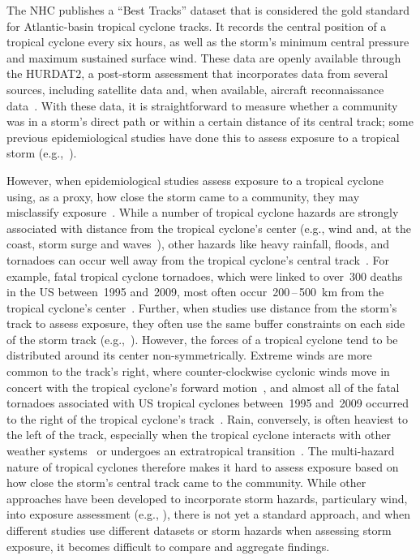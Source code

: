 The \ac{NHC} publishes a ``Best Tracks'' dataset that is considered the gold
standard for Atlantic-basin tropical cyclone tracks.  It records the central
position of a tropical cyclone every six hours, as well as the storm's minimum
central pressure and maximum sustained surface wind.  These data are openly
available through the \ac{HURDAT2}, a post-storm assessment that incorporates
data from several sources, including satellite data and, when available,
aircraft reconnaissance data~\parencite{landsea2013, jarvinen1988}.  With these
data, it is straightforward to measure whether a community was in a storm's
direct path or within a certain distance of its central track; some previous
epidemiological studies have done this to assess exposure to a tropical storm
(e.g.,~\cite{currie2013, kinney2008, caillouet2008increase}).

However, when epidemiological studies assess exposure to a tropical cyclone
using, as a proxy, how close the storm came to a community, they
may misclassify exposure~\parencite{grabich2015measuring}. While a number of
tropical cyclone hazards are strongly associated with distance from the
tropical cyclone's center (e.g., wind and, at the coast, storm surge and
waves~\parencite{rappaport2000, kruk2010}), other hazards like heavy rainfall,
floods, and tornadoes can occur well away from the tropical cyclone's central
track~\parencite{rappaport2000, atallah2007, moore2012}.  For example, fatal
tropical cyclone tornadoes, which were linked to over~300 deaths in the \ac{US}
between~1995 and~2009, most often occur~200\,--\,500~\si{\kilo\metre} from the
tropical cyclone's center~\parencite{moore2012}.  Further, when studies use
distance from the storm's track to assess exposure, they often use the same
buffer constraints on each side of the storm track
(e.g.,~\cite{kinney2008, currie2013}).  However, the forces of a tropical
cyclone tend to be distributed around its center non-symmetrically.  Extreme
winds are more common to the track's right, where counter-clockwise cyclonic
winds move in concert with the tropical cyclone's forward
motion~\parencite{halverson2015}, and almost all of the fatal tornadoes
associated with \ac{US} tropical cyclones between~1995 and~2009 occurred to the
right of the tropical cyclone's track~\parencite{moore2012}. Rain, conversely,
is often heaviest to the left of the track, especially when the tropical
cyclone interacts with other weather systems~\parencite{atallah2003,
atallah2007, zhu2013variations} or undergoes an extratropical
transition~\parencite{elsberry2002}.  The multi-hazard nature of tropical
cyclones therefore makes it hard to assess exposure based on how close the
storm's central track came to the community.  While other approaches have been
developed to incorporate storm hazards, particulary wind, into exposure
assessment (e.g., \cite{grabich2015measuring, zandbergen2009, czajkowski2011}),
there is not yet a standard approach, and when different studies use different
datasets or storm hazards when assessing storm exposure, it becomes difficult
to compare and aggregate findings. 

